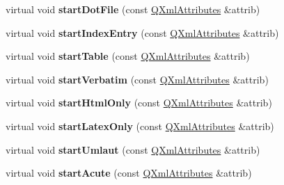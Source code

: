 \begin{DoxyCompactItemize}
\item 
\hypertarget{class_paragraph_handler_aeed29696a81bd6c507050a848768e748}{virtual void {\bfseries start\-Dot\-File} (const \hyperlink{class_q_xml_attributes}{Q\-Xml\-Attributes} \&attrib)}\label{class_paragraph_handler_aeed29696a81bd6c507050a848768e748}

\item 
\hypertarget{class_paragraph_handler_aaac87623a02b661089a61bc607a4fae7}{virtual void {\bfseries start\-Index\-Entry} (const \hyperlink{class_q_xml_attributes}{Q\-Xml\-Attributes} \&attrib)}\label{class_paragraph_handler_aaac87623a02b661089a61bc607a4fae7}

\item 
\hypertarget{class_paragraph_handler_a05b0128d8f0df55bae16f87e5091adcc}{virtual void {\bfseries start\-Table} (const \hyperlink{class_q_xml_attributes}{Q\-Xml\-Attributes} \&attrib)}\label{class_paragraph_handler_a05b0128d8f0df55bae16f87e5091adcc}

\item 
\hypertarget{class_paragraph_handler_ad874c80e7d7dc2968af3374a40018308}{virtual void {\bfseries start\-Verbatim} (const \hyperlink{class_q_xml_attributes}{Q\-Xml\-Attributes} \&attrib)}\label{class_paragraph_handler_ad874c80e7d7dc2968af3374a40018308}

\item 
\hypertarget{class_paragraph_handler_aaac348987af69497090c11d0e5bff088}{virtual void {\bfseries start\-Html\-Only} (const \hyperlink{class_q_xml_attributes}{Q\-Xml\-Attributes} \&attrib)}\label{class_paragraph_handler_aaac348987af69497090c11d0e5bff088}

\item 
\hypertarget{class_paragraph_handler_a7e6162e37c474d57951f4955e3e52415}{virtual void {\bfseries start\-Latex\-Only} (const \hyperlink{class_q_xml_attributes}{Q\-Xml\-Attributes} \&attrib)}\label{class_paragraph_handler_a7e6162e37c474d57951f4955e3e52415}

\item 
\hypertarget{class_paragraph_handler_a450138651a6aedefc420d45965ba3cfc}{virtual void {\bfseries start\-Umlaut} (const \hyperlink{class_q_xml_attributes}{Q\-Xml\-Attributes} \&attrib)}\label{class_paragraph_handler_a450138651a6aedefc420d45965ba3cfc}

\item 
\hypertarget{class_paragraph_handler_ac39e00ef169e22ca723468de93bba48a}{virtual void {\bfseries start\-Acute} (const \hyperlink{class_q_xml_attributes}{Q\-Xml\-Attributes} \&attrib)}\label{class_paragraph_handler_ac39e00ef169e22ca723468de93bba48a}


\end{DoxyCompactItemize}
